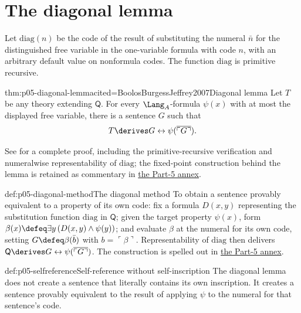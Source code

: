 \section{The diagonal lemma}
\label{sec:p05-diagonalization-01}

Let \(\mathrm{diag}(n)\) be the code of the result of substituting the
numeral \(\bar n\) for the distinguished free variable in the
one-variable formula with code \(n\), with an arbitrary default value on
nonformula codes.  The function \(\mathrm{diag}\) is primitive recursive.

\begin{hbtheorem}{thm:p05-diagonal-lemma}{cited=BoolosBurgessJeffrey2007}{Diagonal lemma}
Let \(T\) be any theory extending \(\mathsf Q\).  For every
\(\Lang_A\)-formula \(\psi(x)\) with at most the displayed free
variable, there is a sentence \(G\) such that
\[
  T\derives G\leftrightarrow
  \psi(\overline{\ulcorner G\urcorner}).
\]
\end{hbtheorem}

See \cite{BoolosBurgessJeffrey2007} for a complete proof, including the
primitive-recursive verification and numeralwise representability of
\(\mathrm{diag}\); the fixed-point construction behind the lemma is
retained as commentary in
\hyperref[annex:p5-diagonal-commentary]{the Part-5 annex}.

\begin{hbmethod}{def:p05-diagonal-method}{The diagonal method}
To obtain a sentence provably equivalent to a property of its own code:
fix a formula \(D(x,y)\) representing the substitution function
\(\mathrm{diag}\) in \(\mathsf Q\); given the target property
\(\psi(x)\), form \(\beta(x)\defeq\exists y\,(D(x,y)\land\psi(y))\);
and evaluate \(\beta\) at the numeral for its own code, setting
\(G\defeq\beta(\bar b)\) with \(b=\ulcorner\beta\urcorner\).
Representability of \(\mathrm{diag}\) then delivers
\(\mathsf Q\derives G\leftrightarrow
\psi(\overline{\ulcorner G\urcorner})\).  The construction is spelled
out in \hyperref[annex:p5-diagonal-commentary]{the Part-5 annex}.
\end{hbmethod}

\begin{hbwarning}{def:p05-selfreference}{Self-reference without self-inscription}
The diagonal lemma does not create a sentence that literally contains its
own inscription.  It creates a sentence provably equivalent to the result
of applying \(\psi\) to the numeral for that sentence's code.
\end{hbwarning}

